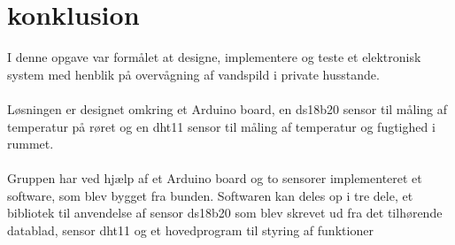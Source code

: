 \section{konklusion}
I denne opgave var formålet at designe, implementere og teste et elektronisk system med henblik på overvågning af vandspild i private husstande.
\\ 
\\
Løsningen er designet omkring et Arduino board, en ds18b20 sensor til måling af temperatur på røret og en dht11 sensor til måling af temperatur og fugtighed i  rummet.
\\
\\
Gruppen har ved hjælp af et Arduino board og to sensorer implementeret et software, som blev bygget fra bunden. Softwaren kan deles op i tre dele, et bibliotek til anvendelse af sensor ds18b20 som blev skrevet ud fra det tilhørende datablad, sensor dht11  og et hovedprogram til styring af funktioner            
